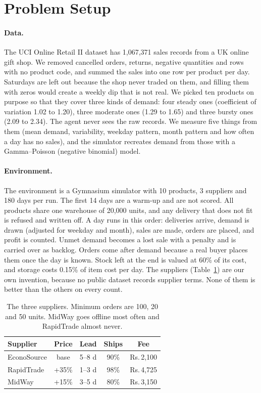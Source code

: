 \documentclass[10pt,twocolumn]{article}
\newcommand{\Rs}{\mbox{Rs.}\,}
\begin{document}
\section{Problem Setup}

\paragraph{Data.}
The UCI Online Retail II dataset \cite{uci} has 1,067,371 sales records from a
UK online gift shop. We removed cancelled orders, returns, negative quantities
and rows with no product code, and summed the sales into one row per product
per day. Saturdays are left out because the shop never traded on them, and
filling them with zeros would create a weekly dip that is not real. We picked
ten products on purpose so that they cover three kinds of demand: four steady
ones (coefficient of variation 1.02 to 1.20), three moderate ones (1.29 to
1.65) and three bursty ones (2.09 to 2.34). The agent never sees the raw
records. We measure five things from them (mean demand, variability, weekday
pattern, month pattern and how often a day has no sales), and the simulator
recreates demand from those with a Gamma--Poisson (negative binomial) model.

\paragraph{Environment.}
The environment is a Gymnasium simulator with 10 products, 3 suppliers and
180 days per run. The first 14 days are a warm-up and are not scored. All
products share one warehouse of 20,000 units, and any delivery that does not
fit is refused and written off. A day runs in this order: deliveries arrive,
demand is drawn (adjusted for weekday and month), sales are made, orders are
placed, and profit is counted. Unmet demand becomes a lost sale with a penalty
and is carried over as backlog. Orders come after demand because a real buyer
places them once the day is known. Stock left at the end is valued at 60\% of
its cost, and storage costs 0.15\% of item cost per day. The suppliers
(Table~\ref{tab:suppliers}) are our own invention, because no public dataset
records supplier terms. None of them is better than the others on every count.

\begin{table}[t]
\centering\small
\setlength{\tabcolsep}{3pt}
\begin{tabular}{lcccc}
\toprule
Supplier & Price & Lead & Ships & Fee \\
\midrule
EconoSource & base & 5--8 d & 90\% & \Rs 2,100 \\
RapidTrade  & +35\% & 1--3 d & 98\% & \Rs 4,725 \\
MidWay      & +15\% & 3--5 d & 80\% & \Rs 3,150 \\
\bottomrule
\end{tabular}
\caption{The three suppliers. Minimum orders are 100, 20 and 50 units. MidWay
goes offline most often and RapidTrade almost never.}
\label{tab:suppliers}
\end{table}
\end{document}
